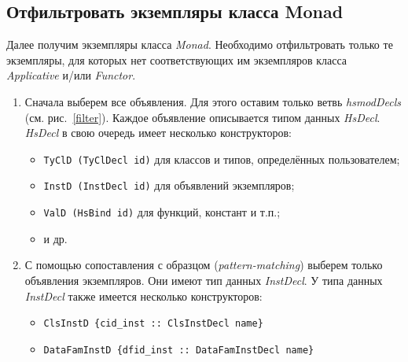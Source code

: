 \subsection{Отфильтровать экземпляры класса Monad}
Далее получим экземпляры класса \textit{Monad}. Необходимо отфильтровать только те экземпляры, для которых нет соответствующих им экземпляров класса \textit{Applicative}  и/или \textit{Functor}.
\begin{enumerate}
\item Сначала выберем все объявления. Для этого оставим только ветвь \textit{hsmodDecls} (см. рис.~\ref{filter}). Каждое объявление описывается типом данных \textit{HsDecl}. \textit{HsDecl} в свою очередь имеет несколько конструкторов:
    \begin{itemize}
        \item \lstinline{TyClD (TyClDecl id)} для классов и типов, определённых пользователем;
        \item \lstinline{InstD (InstDecl id)} для объявлений экземпляров;
        \item \lstinline{ValD (HsBind id)} для функций, констант и т.п.;
        \item и др.
    \end{itemize}
\item С помощью сопоставления с образцом (\textit{pattern-matching}) выберем только объявления экземпляров. Они имеют тип данных \textit{InstDecl}. У типа данных \textit{InstDecl} также имеется несколько конструкторов:
    \begin{itemize}
        \item \lstinline!ClsInstD {cid_inst :: ClsInstDecl name}!
        \item 
        \lstinline!DataFamInstD {dfid_inst :: DataFamInstDecl name}! 
        

\end{itemize}
\end{enumerate}
